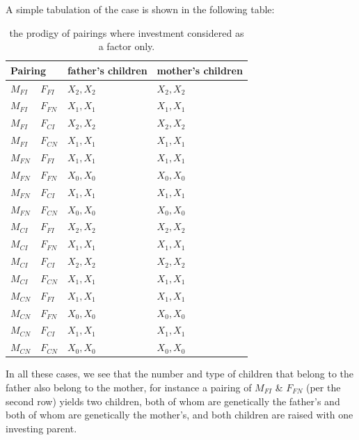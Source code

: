 \documentclass[journal,article,accept,oneauthors,pdftex,10pt,a4paper]{mdpi}
\begin{document}
A simple tabulation of the case is shown in the following table:

\begin{table}[H]
    \centering
    \begin{tabular}{|ll|l|l|}
        \hline
        \multicolumn{2}{|l|}{Pairing} & father's children & mother's children \\
        \hline
        $M_{FI}$ & $F_{FI}$ & $X_2,X_2$ & $X_2,X_2$ \\
        $M_{FI}$ & $F_{FN}$ & $X_1,X_1$ & $X_1,X_1$ \\
        $M_{FI}$ & $F_{CI}$ & $X_2,X_2$ & $X_2,X_2$ \\
        $M_{FI}$ & $F_{CN}$ & $X_1,X_1$ & $X_1,X_1$ \\
        \hline
        $M_{FN}$ & $F_{FI}$ & $X_1,X_1$ & $X_1,X_1$ \\
        $M_{FN}$ & $F_{FN}$ & $X_0,X_0$ & $X_0,X_0$ \\
        $M_{FN}$ & $F_{CI}$ & $X_1,X_1$ & $X_1,X_1$ \\
        $M_{FN}$ & $F_{CN}$ & $X_0,X_0$ & $X_0,X_0$ \\
        \hline
        $M_{CI}$ & $F_{FI}$ & $X_2,X_2$ & $X_2,X_2$ \\
        $M_{CI}$ & $F_{FN}$ & $X_1,X_1$ & $X_1,X_1$ \\
        $M_{CI}$ & $F_{CI}$ & $X_2,X_2$ & $X_2,X_2$ \\
        $M_{CI}$ & $F_{CN}$ & $X_1,X_1$ & $X_1,X_1$ \\
        \hline
        $M_{CN}$ & $F_{FI}$ & $X_1,X_1$ & $X_1,X_1$ \\
        $M_{CN}$ & $F_{FN}$ & $X_0,X_0$ & $X_0,X_0$ \\
        $M_{CN}$ & $F_{CI}$ & $X_1,X_1$ & $X_1,X_1$ \\
        $M_{CN}$ & $F_{CN}$ & $X_0,X_0$ & $X_0,X_0$ \\
        \hline
    \end{tabular}
    \caption{the prodigy of pairings where investment considered as a factor only.}\label{table:outcomes}
\end{table}

In all these cases, we see that the number and type of children that belong to the father also belong to the mother, for instance a pairing of $M_{FI}$ \& $F_{FN}$ (per the second row) yields two children, both of whom are genetically the father's and both of whom are genetically the mother's, and both children are raised with one investing parent.
\end{document}
